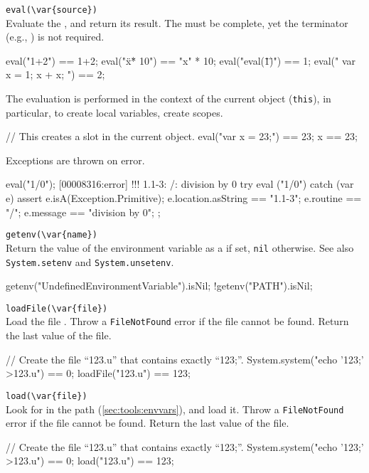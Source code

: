 \begin{urbiscriptapi}
\item \lstinline|eval(\var{source})|\\
  Evaluate the \us {}, and return its result.  The
   must be complete, yet the terminator (e.g., \samp{;})
  is not required.
\begin{urbiassert}
eval("1+2") == 1+2;
eval("\"x\" * 10") == "x" * 10;
eval("eval(\"1\")") ==  1;
eval("{ var x = 1; x + x; }") ==  2;
\end{urbiassert}

  The evaluation is performed in the context of the current object
  (\lstinline|this|), in particular, to create local variables, create
  scopes.
\begin{urbiassert}
// This creates a slot in the current object.
eval("var x = 23;") == 23;
x == 23;
\end{urbiassert}

  Exceptions are thrown on error.
\begin{urbiscript}
eval("1/0");
[00008316:error] !!! 1.1-3: /: division by 0
try
{
  eval ("1/0")
}
catch (var e)
{
  assert
  {
    e.isA(Exception.Primitive);
    e.location.asString  == "1.1-3";
    e.routine            == "/";
    e.message            == "division by 0";
  }
};
\end{urbiscript}

\item \lstinline|getenv(\var{name})|\\
  Return the value of the environment variable  as a
   if set, \lstinline|nil| otherwise.  See also
  \lstinline|System.setenv| and \lstinline|System.unsetenv|.
\begin{urbiassert}
getenv("UndefinedEnvironmentVariable").isNil;
!getenv("PATH").isNil;
\end{urbiassert}

\item \lstinline|loadFile(\var{file})|\\
  Load the \us file .  Throw a \lstinline|FileNotFound|
  error if the file cannot be found.  Return the last value of the
  file.
\begin{urbiassert}
// Create the file ``123.u'' that contains exactly ``123;''.
System.system("echo '123;' >123.u") == 0;
loadFile("123.u") == 123;
\end{urbiassert}

\item \lstinline|load(\var{file})|\\
  Look for  in the \urbi path (\autoref{sec:tools:envvars}),
  and load it.  Throw a \lstinline|FileNotFound| error if the file
  cannot be found.  Return the last value of the file.
\begin{urbiassert}
// Create the file ``123.u'' that contains exactly ``123;''.
System.system("echo '123;' >123.u") == 0;
load("123.u") == 123;
\end{urbiassert}


\end{urbiscriptapi}

